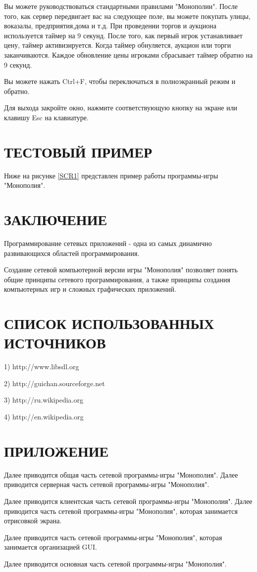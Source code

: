 Вы можете руководствоваться стандартными правилами "Монополии". После того, как сервер передвигает вас на следующее поле, вы можете покупать улицы, воказалы, предприятия,дома и т.д. При проведении торгов и аукциона используется таймер на 9 секунд. После того, как первый игрок устанавливает цену, таймер активизируется. Когда таймер обнуляется, аукцион или торги заканчиваются. Каждое обновление цены игроками сбрасывает таймер обратно на 9 секунд.

Вы можете нажать Ctrl+F, чтобы переключаться в полноэкранный режим и обратно.

Для выхода закройте окно, нажмите соответствующую кнопку на экране или клавишу Esc на клавиатуре.  
\section{ТЕСТОВЫЙ ПРИМЕР}
Ниже на рисунке \ref{SCR1} представлен пример работы программы-игры "Монополия".
\section*{ЗАКЛЮЧЕНИЕ}
Программирование сетевых приложений - одна из самых динамично развивающихся областей программирования.

Создание сетевой компьютерной версии игры "Монополия" позволяет понять общие принципы сетевого программирования, а также принципы создания компьютерных игр и сложных графических приложений. 
\section*{СПИСОК ИСПОЛЬЗОВАННЫХ ИСТОЧНИКОВ}
1) http://www.libsdl.org

2) http://guichan.sourceforge.net

3) http://ru.wikipedia.org

4) http://en.wikipedia.org
\section*{ПРИЛОЖЕНИЕ}
Далее приводится общая часть сетевой программы-игры "Монополия".
Далее приводится серверная часть сетевой программы-игры "Монополия".

Далее приводится клиентская часть сетевой программы-игры "Монополия".
Далее приводится часть сетевой программы-игры "Монополия", которая занимается отрисовкой экрана.

Далее приводится часть сетевой программы-игры "Монополия", которая занимается организацией GUI.

Далее приводится основная часть сетевой программы-игры "Монополия".


